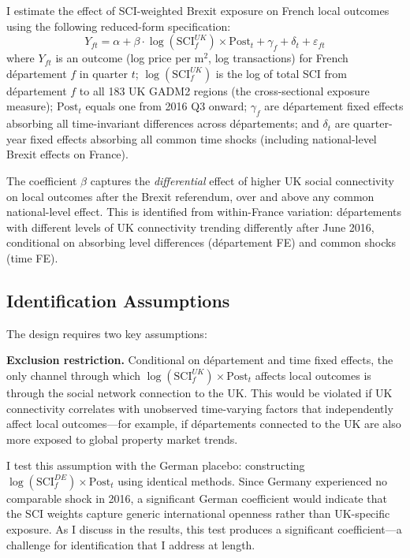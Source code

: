 \documentclass[12pt]{article}
\begin{document}
I estimate the effect of SCI-weighted Brexit exposure on French local outcomes using the following reduced-form specification:
\begin{equation}
Y_{ft} = \alpha + \beta \cdot \log(\text{SCI}_f^{UK}) \times \text{Post}_t + \gamma_f + \delta_t + \varepsilon_{ft}
\label{eq:main}
\end{equation}
where $Y_{ft}$ is an outcome (log price per m$^2$, log transactions) for French d\'epartement $f$ in quarter $t$; $\log(\text{SCI}_f^{UK})$ is the log of total SCI from d\'epartement $f$ to all 183 UK GADM2 regions (the cross-sectional exposure measure); $\text{Post}_t$ equals one from 2016 Q3 onward; $\gamma_f$ are d\'epartement fixed effects absorbing all time-invariant differences across d\'epartements; and $\delta_t$ are quarter-year fixed effects absorbing all common time shocks (including national-level Brexit effects on France).

The coefficient $\beta$ captures the \textit{differential} effect of higher UK social connectivity on local outcomes after the Brexit referendum, over and above any common national-level effect. This is identified from within-France variation: d\'epartements with different levels of UK connectivity trending differently after June 2016, conditional on absorbing level differences (d\'epartement FE) and common shocks (time FE).

\subsection{Identification Assumptions}

The design requires two key assumptions:

\textbf{Exclusion restriction.} Conditional on d\'epartement and time fixed effects, the only channel through which $\log(\text{SCI}_f^{UK}) \times \text{Post}_t$ affects local outcomes is through the social network connection to the UK. This would be violated if UK connectivity correlates with unobserved time-varying factors that independently affect local outcomes---for example, if d\'epartements connected to the UK are also more exposed to global property market trends.

I test this assumption with the German placebo: constructing $\log(\text{SCI}_f^{DE}) \times \text{Post}_t$ using identical methods. Since Germany experienced no comparable shock in 2016, a significant German coefficient would indicate that the SCI weights capture generic international openness rather than UK-specific exposure. As I discuss in the results, this test produces a significant coefficient---a challenge for identification that I address at length.
\end{document}
